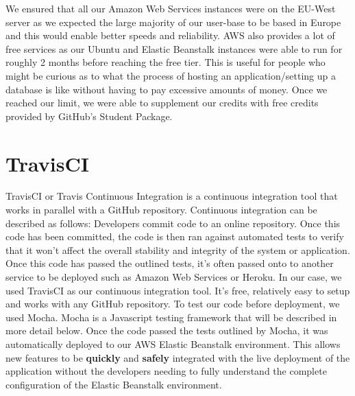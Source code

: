 We ensured that all our Amazon Web Services instances were on the EU-West server as we expected the large majority of our user-base to be based in Europe and this would enable better speeds and reliability. AWS also provides a lot of free services as our Ubuntu and Elastic Beanstalk instances were able to run for roughly 2 months before reaching the free tier. This is useful 
for people who might be curious as to what the process of hosting an application/setting up a database is like without having to pay excessive amounts of money. Once we reached our limit, we were able to supplement our credits with free credits provided by GitHub's Student Package. 

\section{TravisCI}
TravisCI or Travis Continuous Integration is a continuous integration tool that works in parallel with a GitHub repository. Continuous integration can be described as follows: Developers commit code to an online repository. Once this code has been committed, the code is then ran against automated tests to verify that it won't affect the overall stability and integrity of the system or application. Once this
code has passed the outlined tests, it's often passed onto to another service to be deployed such as Amazon Web Services or Heroku. In our case, we used TravisCI as our continuous integration tool. It's free, relatively easy to setup and works with any GitHub repository. To test our code before deployment, we used Mocha. Mocha is a Javascript testing framework that will be described in more detail below. Once the code passed the tests outlined by Mocha, it was automatically deployed to our AWS Elastic Beanstalk environment. This allows new features to be \textbf{quickly} and \textbf{safely} integrated with the live deployment of the application without 
the developers needing to fully understand the complete configuration of the Elastic Beanstalk environment. 

